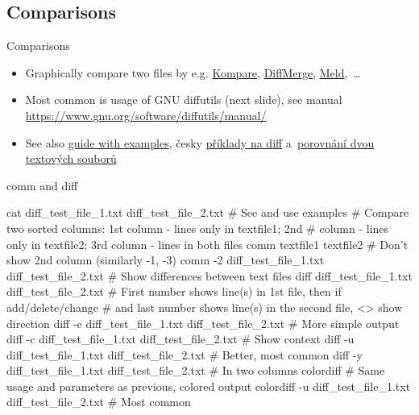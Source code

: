 \documentclass[compress, ucs, xelatex, 11pt, xcolor=svgnames, aspectratio=169,
	hyperref={
		bookmarks=true,
		unicode=true,
		colorlinks=true,
		pdftitle={Linux, command line and MetaCentrum},
		plainpages=false,
		pdfauthor={Vojtech Zeisek},
		pdfsubject={Course about use of Linux command line, writing shell scripts and using MetaCentrum of CESNET},
		pdfcreator={XeLaTeX},
		pdfkeywords={Linux, GNU, BASH, shell, command line, MetaCentrum},
		linkcolor=DarkRed, %
		anchorcolor=DarkBlue, %
		citecolor=Indigo, %
		filecolor=NavyBlue, %
		menucolor=DarkMagenta, %
		urlcolor=DarkBlue, %
		pdftex},
	url={hyphens, lowtilde} %
	]{beamer}
\renewcommand{\texttt}[1]{\colorbox{Beige}{{\ttfamily #1}}}
\begin{document}
\subsection{Comparisons}

\begin{frame}{Comparisons}
	\begin{itemize}
		\item Graphically compare two files by e.g. \href{https://apps.kde.org/en/kompare}{Kompare}, \href{https://sourcegear.com/diffmerge/}{DiffMerge}, \href{https://meldmerge.org/}{Meld},~\ldots
		\item Most common is usage of GNU diffutils (next slide), see manual \url{https://www.gnu.org/software/diffutils/manual/}
		\item See also \href{https://www.computerhope.com/unix/udiff.htm}{guide with examples}, česky \href{https://blog.root.cz/petrkrcmar/diff-jak-cist-vystup-z-porovnani-souboru/}{příklady na diff} a~\href{https://www.root.cz/clanky/nastroje-pro-porovnani-obsahu-dvou-textovych-souboru/}{porovnání dvou textových souborů}
	\end{itemize}
	\begin{center}
		\texttt{[image: kompare.png]}
	\end{center}
\end{frame}

\begin{frame}[fragile]{comm and diff}
	\begin{bashcode}
    cat diff_test_file_1.txt diff_test_file_2.txt # See and use examples
    # Compare two sorted columns: 1st column - lines only in textfile1; 2nd
    # column - lines only in textfile2; 3rd column - lines in both files
    comm textfile1 textfile2
    # Don't show 2nd column (similarly -1, -3)
    comm -2 diff_test_file_1.txt diff_test_file_2.txt
    # Show differences between text files
    diff diff_test_file_1.txt diff_test_file_2.txt
      # First number shows line(s) in 1st file, then if add/delete/change
      # and last number shows line(s) in the second file, <> show direction
    diff -e diff_test_file_1.txt diff_test_file_2.txt # More simple output
    diff -c diff_test_file_1.txt diff_test_file_2.txt # Show context
    diff -u diff_test_file_1.txt diff_test_file_2.txt # Better, most common
    diff -y diff_test_file_1.txt diff_test_file_2.txt # In two columns
    colordiff # Same usage and parameters as previous, colored output
    colordiff -u diff_test_file_1.txt diff_test_file_2.txt # Most common
	\end{bashcode}
\end{frame}
\end{document}
